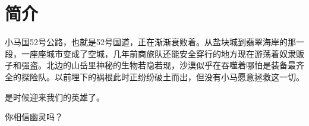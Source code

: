\chapter{简介}

小马国52号公路，也就是52号国道，正在渐渐衰败着。从盐块城到翡翠海岸的那一段，一座座城市变成了空城，几年前商旅队还能安全穿行的地方现在游荡着奴隶贩子和强盗。北边的山岳里神秘的生物若隐若现，沙漠似乎在吞噬着哪怕是装备最齐全的探险队。以前埋下的祸根此时正纷纷破土而出，但没有小马愿意拯救这一切。

是时候迎来我们的英雄了。

\clearpage

\begin{motto}
你相信幽灵吗？
\end{motto}



